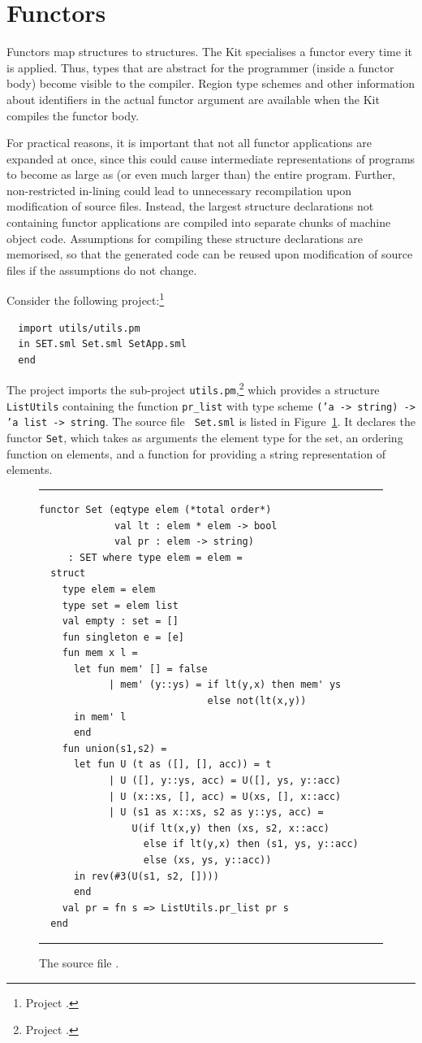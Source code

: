 \documentclass[12pt]{book}
\begin{document}
\section{Functors \label{functors.sec}}
Functors map structures to structures. The Kit
specialises a functor every time it is applied.
Thus, types that are
abstract for the programmer (inside a functor body) become 
visible to the compiler.
Region type schemes and other information about identifiers in the
actual functor argument
are available when the Kit compiles the functor body.

For practical reasons, it is important that not all functor applications
are expanded at once, since this could 
cause intermediate representations of
programs  to become as large as (or even 
much larger than) the entire
program. Further, non-restricted in-lining could lead to unnecessary
recompilation upon modification of source files. Instead, the largest
structure declarations not containing functor applications are
compiled into separate chunks of machine object code. Assumptions for
compiling these structure declarations are memorised, so that the
generated code can be reused upon modification of source files if the
assumptions do not change.

Consider the following project:\footnote{Project
  .}
\begin{verbatim}
  import utils/utils.pm
  in SET.sml Set.sml SetApp.sml
  end
\end{verbatim}
The project imports the sub-project {\tt utils.pm},\footnote{Project
.} which provides a structure {\tt
ListUtils} containing the function {\tt pr\_list} with type scheme
{\tt ('a -> string) -> 'a list -> string}. The source file {\tt
Set.sml} is listed in Figure~\ref{Set.fig}. It
declares the functor {\tt Set}, which takes as arguments the element
type for the set, an ordering function on elements, and a function for providing a string representation of elements.
\begin{figure}[ht]
\hrule \medskip
\begin{verbatim}
functor Set (eqtype elem (*total order*)
             val lt : elem * elem -> bool
             val pr : elem -> string) 
     : SET where type elem = elem =
  struct
    type elem = elem
    type set = elem list
    val empty : set = []
    fun singleton e = [e]
    fun mem x l =
      let fun mem' [] = false
            | mem' (y::ys) = if lt(y,x) then mem' ys
                             else not(lt(x,y))
      in mem' l
      end
    fun union(s1,s2) =
      let fun U (t as ([], [], acc)) = t
            | U ([], y::ys, acc) = U([], ys, y::acc)
            | U (x::xs, [], acc) = U(xs, [], x::acc)
            | U (s1 as x::xs, s2 as y::ys, acc) =
                U(if lt(x,y) then (xs, s2, x::acc)
                  else if lt(y,x) then (s1, ys, y::acc)
                  else (xs, ys, y::acc))
      in rev(#3(U(s1, s2, [])))
      end
    val pr = fn s => ListUtils.pr_list pr s
  end
\end{verbatim}
\caption{The source file .}
\medskip \hrule \label{Set.fig} 
\end{figure}
\end{document}
